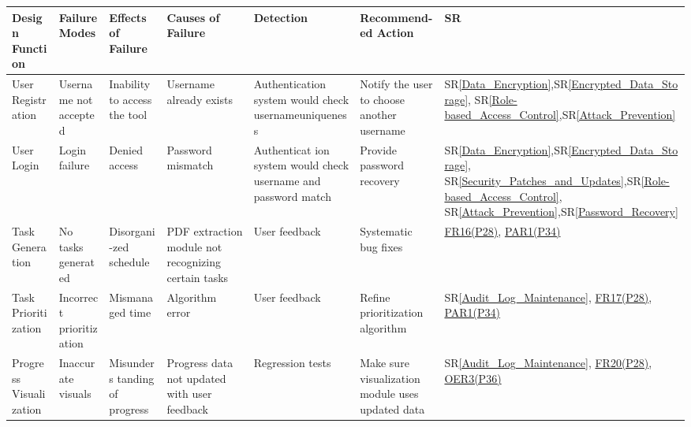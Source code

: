 \documentclass{article}
\newcommand{\srref}[1]{SR\ref{#1}}
\begin{document}
\begin{longtable}{|p{1.5cm}|p{1.5cm}|p{1.5cm}|p{2cm}|p{2cm}|p{2cm}|p{1.8cm}|}
  \hline
  \textbf{Design Function} & \textbf{Failure Modes} & \textbf{Effects of Failure} & \textbf{Causes of Failure} & \textbf{Detection} & \textbf{Recommend\newline -ed Action} & \textbf{SR} \\
  \hline
  User Registration & Username not accepted & Inability to access the tool & Username already exists & Authenticati\-on system would check username\newline uniqueness & Notify the user to choose another username & \srref{Data_Encryption},\srref{Encrypted_Data_Storage}, \srref{Role-based_Access_Control},\srref{Attack_Prevention} \\
  \hline
  User Login & Login failure & Denied access & Password mismatch & Authenticat \-ion system would check username and password match & Provide password recovery & \srref{Data_Encryption},\srref{Encrypted_Data_Storage}, \srref{Security_Patches_and_Updates},\srref{Role-based_Access_Control}, \srref{Attack_Prevention},\srref{Password_Recovery} \\
  \hline
  Task Generation & No tasks generated & Disorgani -zed schedule & PDF extraction module not recognizing certain tasks & User feedback & Systematic bug fixes & \href{https://github.com/wangq131/4G06CapstoneProjectT5/blob/689841fefc298f80d84232996e1c7ca7981dd93d/docs/SRS/SRS.pdf}{FR16(P28)}, \href{https://github.com/wangq131/4G06CapstoneProjectT5/blob/689841fefc298f80d84232996e1c7ca7981dd93d/docs/SRS/SRS.pdf}{PAR1(P34)} \\
  \hline
  Task Prioritization & Incorrect prioritization & Mismana \-ged time & Algorithm error & User feedback & Refine prioritization algorithm & \srref{Audit_Log_Maintenance}, \href{https://github.com/wangq131/4G06CapstoneProjectT5/blob/689841fefc298f80d84232996e1c7ca7981dd93d/docs/SRS/SRS.pdf}{FR17(P28)}, \href{https://github.com/wangq131/4G06CapstoneProjectT5/blob/689841fefc298f80d84232996e1c7ca7981dd93d/docs/SRS/SRS.pdf}{PAR1(P34)} \\
  \hline
  Progress Visualization & Inaccurate visuals & Misunders \-tanding of progress & Progress data not updated with user feedback & Regression tests & Make sure visualization module uses updated data & \srref{Audit_Log_Maintenance}, \href{https://github.com/wangq131/4G06CapstoneProjectT5/blob/689841fefc298f80d84232996e1c7ca7981dd93d/docs/SRS/SRS.pdf}{FR20(P28)}, \href{https://github.com/wangq131/4G06CapstoneProjectT5/blob/689841fefc298f80d84232996e1c7ca7981dd93d/docs/SRS/SRS.pdf}{OER3(P36)}\\

\end{longtable}
\end{document}

